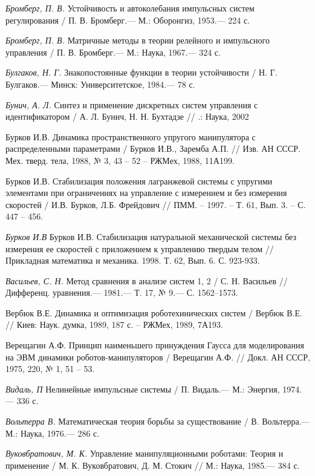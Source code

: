 \begin{thebibliography}{10}
	{\it Бромберг, П. В.} Устойчивость и автоколебания импульсных систем регулирования /
	П. В. Бромберг.— М.: Оборонгиз, 1953.— 224 с.
	
	{\it Бромберг, П. В.} Матричные методы в теории релейного и импульсного управления /
	П. В. Бромберг.— М.: Наука, 1967.— 324 с.
	
	{\it Булгаков, Н. Г.} Знакопостоянные функции в теории устойчивости /
	Н. Г. Булгаков.— Минск: Университетское, 1984.— 78 с.
	
	{\it Бунич, А. Л.} Синтез и применение дискретных систем управления с идентификатором /
	А. Л. Бунич, Н. Н. Бухтадзе // .: Наука, 2002
	
	Бурков И.В. Динамика пространственного упругого манипулятора с распределенными параметрами / Бурков И.В., Заремба А.П. // Изв. АН СССР. Мех. тверд. тела, 1988, № 3, 43 – 52 – РЖМех, 1988, 11А199.
	
	Бурков И.В. Стабилизация положения лагранжевой системы с упругими элементами при ограничениях на управление с измерением и без измерения скоростей / И.В. Бурков, Л.Б. Фрейдович // ПММ. – 1997. – Т. 61, Вып. 3. – С. 447 – 456.
	
	{\it Бурков И.В} Бурков И.В. Стабилизация натуральной механической системы без измерения ее скоростей с приложением к управлению твердым телом // Прикладная математика и механика. 1998. Т. 62, Вып. 6. С. 923-933.
	
	{\it Васильев, С. Н.} Метод сравнения в анализе систем 1, 2 / С. Н. Васильев // Дифференц.
	уравнения.— 1981.— Т. 17, № 9.— С. 1562–1573.
	
	Вербюк В.Е. Динамика и оптимизация роботехинических систем / Вербюк В.Е. // Киев: Наук. думка, 1989, 187 с. – РЖМех, 1989, 7А193.
	
	Верещагин А.Ф. Принцип наименьшего принуждения Гаусса для моделирования на ЭВМ динамики роботов-манипуляторов / Верещагин А.Ф. // Докл. АН СССР, 1975, 220, № 1, 51 – 53.
	
	{\it Видаль, П} Нелинейные импульсные системы / П. Видаль.— М.: Энергия, 1974.— 336 с.
	
	{\it Вольтерра В.} Математическая теория борьбы за существование /
	В. Вольтерра.— М.: Наука, 1976.— 286 с.
	
	{\it Вуковбратович, М. К.} Управление манипуляционными роботами: Теория и применение /
	М. К. Вуковбратович, Д. М. Стокич // М.: Наука, 1985.— 384 с.
	

\end{thebibliography}
